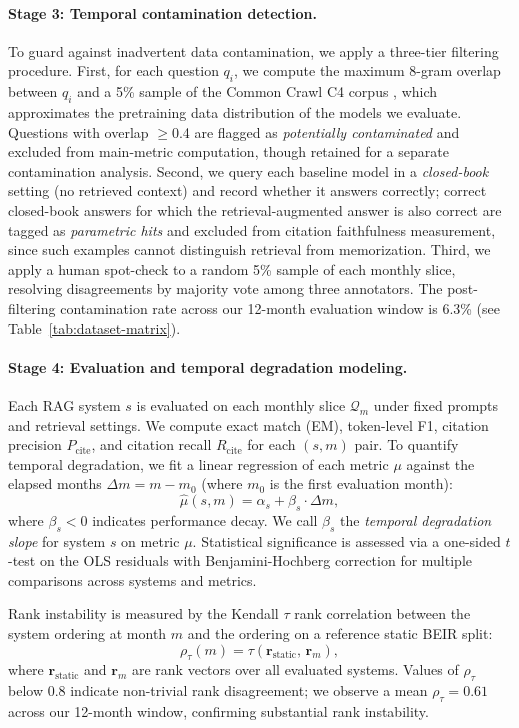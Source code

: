\paragraph{Stage 3: Temporal contamination detection.}
To guard against inadvertent data contamination, we apply a three-tier filtering procedure. First, for each question $q_i$, we compute the maximum 8-gram overlap between $q_i$ and a 5\% sample of the Common Crawl C4 corpus \citep{raffel2020t5}, which approximates the pretraining data distribution of the models we evaluate. Questions with overlap $\geq$0.4 are flagged as \emph{potentially contaminated} and excluded from main-metric computation, though retained for a separate contamination analysis. Second, we query each baseline model in a \emph{closed-book} setting (no retrieved context) and record whether it answers correctly; correct closed-book answers for which the retrieval-augmented answer is also correct are tagged as \emph{parametric hits} and excluded from citation faithfulness measurement, since such examples cannot distinguish retrieval from memorization. Third, we apply a human spot-check to a random 5\% sample of each monthly slice, resolving disagreements by majority vote among three annotators. The post-filtering contamination rate across our 12-month evaluation window is 6.3\% (see Table~\ref{tab:dataset-matrix}).

\paragraph{Stage 4: Evaluation and temporal degradation modeling.}
Each RAG system $s$ is evaluated on each monthly slice $\mathcal{Q}_m$ under fixed prompts and retrieval settings. We compute exact match (EM), token-level F1, citation precision $P_{\text{cite}}$, and citation recall $R_{\text{cite}}$ for each $(s, m)$ pair. To quantify temporal degradation, we fit a linear regression of each metric $\mu$ against the elapsed months $\Delta m = m - m_0$ (where $m_0$ is the first evaluation month):
\begin{equation}
  \hat{\mu}(s, m) = \alpha_s + \beta_s \cdot \Delta m,
  \label{eq:degradation}
\end{equation}
where $\beta_s < 0$ indicates performance decay. We call $\beta_s$ the \emph{temporal degradation slope} for system $s$ on metric $\mu$. Statistical significance is assessed via a one-sided $t$-test on the OLS residuals with Benjamini-Hochberg correction for multiple comparisons across systems and metrics.

Rank instability is measured by the Kendall $\tau$ rank correlation between the system ordering at month $m$ and the ordering on a reference static BEIR split:
\begin{equation}
  \rho_{\tau}(m) = \tau\!\left(\mathbf{r}_{\text{static}},\, \mathbf{r}_{m}\right),
  \label{eq:rank-tau}
\end{equation}
where $\mathbf{r}_{\text{static}}$ and $\mathbf{r}_{m}$ are rank vectors over all evaluated systems. Values of $\rho_\tau$ below 0.8 indicate non-trivial rank disagreement; we observe a mean $\rho_\tau = 0.61$ across our 12-month window, confirming substantial rank instability.
